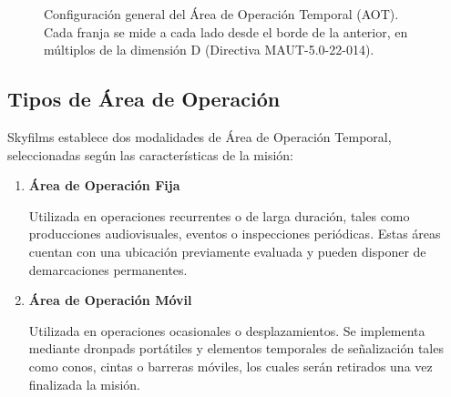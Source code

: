 \begin{figure}[H]
\centering
{}
\caption{Configuración general del Área de Operación Temporal (AOT). Cada franja se mide a cada lado desde el borde de la anterior, en múltiplos de la dimensión D (Directiva MAUT-5.0-22-014).}
\label{fig:aot}
\end{figure}

\subsection{Tipos de Área de Operación}

Skyfilms establece dos modalidades de Área de Operación Temporal, seleccionadas según las características de la misión:

\begin{enumerate}[label=\alph*)]

\item \textbf{Área de Operación Fija}

Utilizada en operaciones recurrentes o de larga duración, tales como producciones audiovisuales, eventos o inspecciones periódicas. Estas áreas cuentan con una ubicación previamente evaluada y pueden disponer de demarcaciones permanentes.

\item \textbf{Área de Operación Móvil}

Utilizada en operaciones ocasionales o desplazamientos. Se implementa mediante dronpads portátiles y elementos temporales de señalización tales como conos, cintas o barreras móviles, los cuales serán retirados una vez finalizada la misión.

\end{enumerate}


